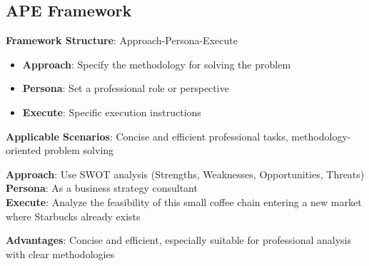 \documentclass[12pt]{article}
\begin{document}
\subsection{APE Framework}

\textbf{Framework Structure}: Approach-Persona-Execute

\begin{itemize}
  \item \textbf{Approach}: Specify the methodology for solving the problem
  \item \textbf{Persona}: Set a professional role or perspective
  \item \textbf{Execute}: Specific execution instructions
\end{itemize}

\textbf{Applicable Scenarios}: Concise and efficient professional tasks, methodology-oriented problem solving

\begin{promptbox}
\textbf{Approach}: Use SWOT analysis (Strengths, Weaknesses, Opportunities, Threats)\\

\textbf{Persona}: As a business strategy consultant\\

\textbf{Execute}: Analyze the feasibility of this small coffee chain entering a new market where Starbucks already exists
\end{promptbox}

\textbf{Advantages}: Concise and efficient, especially suitable for professional analysis with clear methodologies
\end{document}
